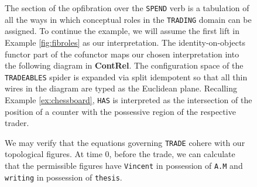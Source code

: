 \begin{example}
\begin{figure}
\end{figure}
\begin{figure}[h]\label{fig:interpret}
\centering
{}
\caption{The section of the opfibration over the \texttt{SPEND} verb is a tabulation of all the ways in which conceptual roles in the \texttt{TRADING} domain can be assigned. To continue the example, we will assume the first lift in Example \ref{fig:fibroles} as our interpretation. The identity-on-objects functor part of the cofunctor maps our chosen interpretation into the following diagram in \textbf{ContRel}. The configuration space of the \texttt{TRADEABLES} spider is expanded via split idempotent so that all thin wires in the diagram are typed as the Euclidean plane. Recalling Example \ref{ex:chessboard}, \texttt{HAS} is interpreted as the intersection of the position of a counter with the possessive region of the respective trader.}
\end{figure}
\begin{figure}[h]\label{fig:time0}
\centering
{}
\vspace{5cm}
\caption{We may verify that the equations governing \texttt{TRADE} cohere with our topological figures. At time 0, before the trade, we can calculate that the permissible figures have \texttt{Vincent} in possession of \texttt{A.M} and \texttt{writing} in possession of \texttt{thesis}.}

\end{figure}
\end{example}
